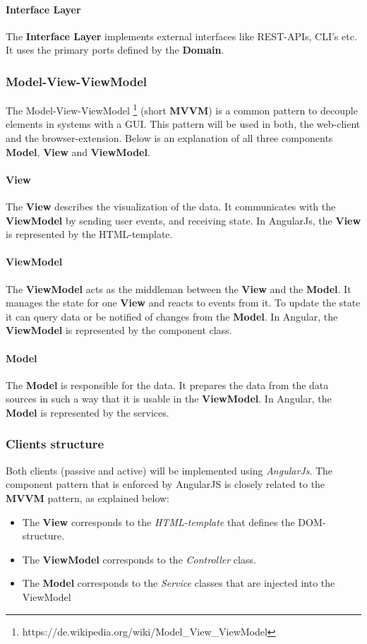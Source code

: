 \paragraph{Interface Layer}
The \textbf{Interface Layer} implements external interfaces like REST-APIs, CLI's etc.
It uses the primary ports defined by the \textbf{Domain}.

\subsubsection{Model-View-ViewModel}
The Model-View-ViewModel \footnote{https://de.wikipedia.org/wiki/Model\_View\_ViewModel} (short \textbf{MVVM}) is a common pattern to decouple elements in systems with a GUI\@.
This pattern will be used in both, the web-client and the browser-extension.
Below is an explanation of all three components \textbf{Model}, \textbf{View} and \textbf{ViewModel}.

\paragraph{View}
The \textbf{View} describes the visualization of the data.
It communicates with the \textbf{ViewModel} by sending user events, and receiving state.
In AngularJs, the \textbf{View} is represented by the HTML-template.

\paragraph{ViewModel}
The \textbf{ViewModel} acts as the middleman between the \textbf{View} and the \textbf{Model}.
It manages the state for one \textbf{View} and reacts to events from it.
To update the state it can query data or be notified of changes from the \textbf{Model}.
In Angular, the \textbf{ViewModel} is represented by the component class.

\paragraph{Model}
The \textbf{Model} is responsible for the data.
It prepares the data from the data sources in such a way that it is usable in the \textbf{ViewModel}.
In Angular, the \textbf{Model} is represented by the services.

\subsubsection{Clients structure}
Both clients (passive and active) will be implemented using \textit{AngularJs}.
The component pattern that is enforced by AngularJS is closely related to the \textbf{MVVM} pattern, as explained below:
\begin{itemize}
    \item The \textbf{View} corresponds to the \textit{HTML-template} that defines the DOM-structure.
    \item The \textbf{ViewModel} corresponds to the \textit{Controller} class.
    \item The \textbf{Model} corresponds to the \textit{Service} classes that are injected into the ViewModel
\end{itemize}

